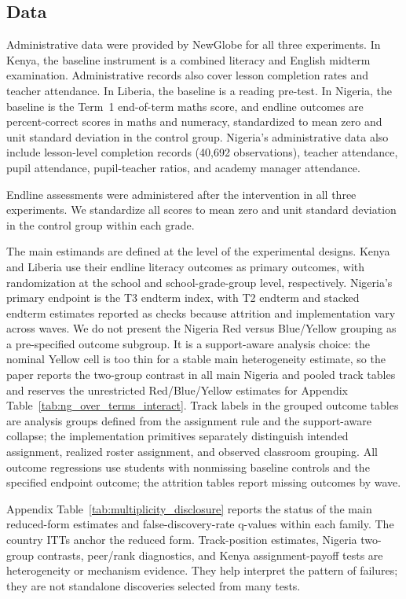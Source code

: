 \documentclass[11pt]{article}
\begin{document}
\subsection{Data}

Administrative data were provided by NewGlobe for all three experiments. In Kenya, the baseline instrument is a combined literacy and English midterm examination. Administrative records also cover lesson completion rates and teacher attendance. In Liberia, the baseline is a reading pre-test. In Nigeria, the baseline is the Term~1 end-of-term maths score, and endline outcomes are percent-correct scores in maths and numeracy, standardized to mean zero and unit standard deviation in the control group. Nigeria's administrative data also include lesson-level completion records (40,692 observations), teacher attendance, pupil attendance, pupil-teacher ratios, and academy manager attendance.

Endline assessments were administered after the intervention in all three experiments. We standardize all scores to mean zero and unit standard deviation in the control group within each grade.

The main estimands are defined at the level of the experimental designs. Kenya and Liberia use their endline literacy outcomes as primary outcomes, with randomization at the school and school-grade-group level, respectively. Nigeria's primary endpoint is the T3 endterm index, with T2 endterm and stacked endterm estimates reported as checks because attrition and implementation vary across waves. We do not present the Nigeria Red versus Blue/Yellow grouping as a pre-specified outcome subgroup. It is a support-aware analysis choice: the nominal Yellow cell is too thin for a stable main heterogeneity estimate, so the paper reports the two-group contrast in all main Nigeria and pooled track tables and reserves the unrestricted Red/Blue/Yellow estimates for Appendix Table~\ref{tab:ng_over_terms_interact}. Track labels in the grouped outcome tables are analysis groups defined from the assignment rule and the support-aware collapse; the implementation primitives separately distinguish intended assignment, realized roster assignment, and observed classroom grouping. All outcome regressions use students with nonmissing baseline controls and the specified endpoint outcome; the attrition tables report missing outcomes by wave.

Appendix Table~\ref{tab:multiplicity_disclosure} reports the status of the main reduced-form estimates and false-discovery-rate q-values within each family. The country ITTs anchor the reduced form. Track-position estimates, Nigeria two-group contrasts, peer/rank diagnostics, and Kenya assignment-payoff tests are heterogeneity or mechanism evidence. They help interpret the pattern of failures; they are not standalone discoveries selected from many tests.
\end{document}

